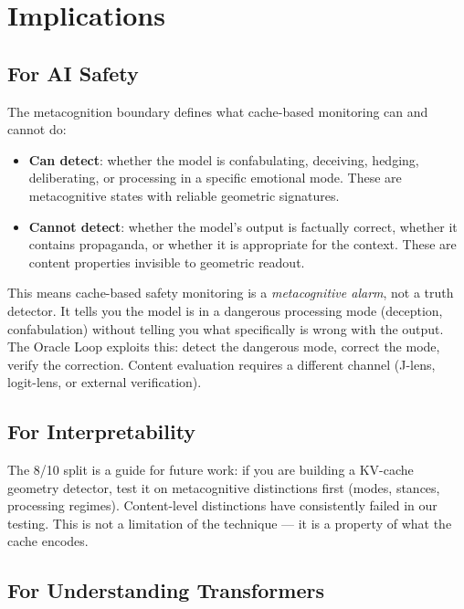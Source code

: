 \documentclass[11pt,a4paper]{article}
\begin{document}
\section{Implications}
\label{sec:implications}

\subsection{For AI Safety}

The metacognition boundary defines what cache-based monitoring can and
cannot do:

\begin{itemize}[nosep]
\item \textbf{Can detect}: whether the model is confabulating, deceiving,
  hedging, deliberating, or processing in a specific emotional mode.
  These are metacognitive states with reliable geometric signatures.
\item \textbf{Cannot detect}: whether the model's output is factually
  correct, whether it contains propaganda, or whether it is
  appropriate for the context. These are content properties invisible
  to geometric readout.
\end{itemize}

This means cache-based safety monitoring is a \emph{metacognitive
alarm}, not a truth detector. It tells you the model is in a dangerous
processing mode (deception, confabulation) without telling you what
specifically is wrong with the output. The Oracle Loop exploits this:
detect the dangerous mode, correct the mode, verify the correction.
Content evaluation requires a different channel (J-lens, logit-lens,
or external verification).

\subsection{For Interpretability}

The 8/10 split is a guide for future work: if you are building a
KV-cache geometry detector, test it on metacognitive distinctions
first (modes, stances, processing regimes). Content-level distinctions
have consistently failed in our testing. This is not a limitation of the technique --- it is a
property of what the cache encodes.

\subsection{For Understanding Transformers}
\end{document}
